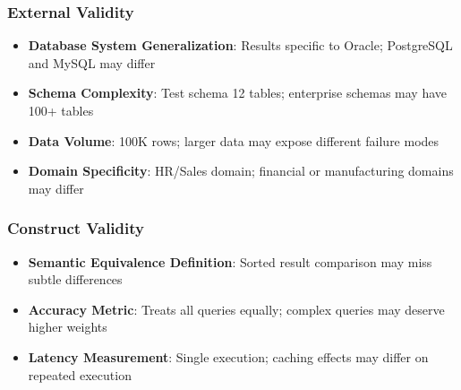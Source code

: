 \subsubsection{External Validity}

\begin{itemize}
    \item \textbf{Database System Generalization}: Results specific to Oracle; PostgreSQL and MySQL may differ
    \item \textbf{Schema Complexity}: Test schema 12 tables; enterprise schemas may have 100+ tables
    \item \textbf{Data Volume}: 100K rows; larger data may expose different failure modes
    \item \textbf{Domain Specificity}: HR/Sales domain; financial or manufacturing domains may differ
\end{itemize}

\subsubsection{Construct Validity}

\begin{itemize}
    \item \textbf{Semantic Equivalence Definition}: Sorted result comparison may miss subtle differences
    \item \textbf{Accuracy Metric}: Treats all queries equally; complex queries may deserve higher weights
    \item \textbf{Latency Measurement}: Single execution; caching effects may differ on repeated execution
\end{itemize}
